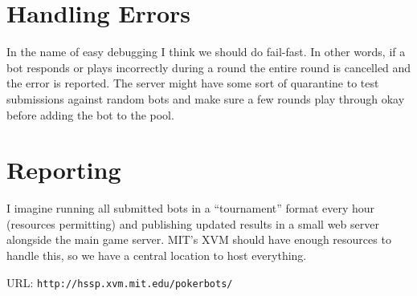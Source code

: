 \documentclass{article}
\begin{document}
\section{Handling Errors}
In the name of easy debugging I think we should do fail-fast. In
other words, if a bot responds or plays incorrectly during a round
the entire round is cancelled and the error is reported. The server
might have some sort of quarantine to test submissions against
random bots and make sure a few rounds play through okay before
adding the bot to the pool.

\section{Reporting}
I imagine running all submitted bots in a ``tournament'' format every
hour (resources permitting) and publishing updated results in a small
web server alongside the main game server. MIT's XVM should have enough
resources to handle this, so we have a central location to host everything.

URL: \texttt{http://hssp.xvm.mit.edu/pokerbots/}
\end{document}
